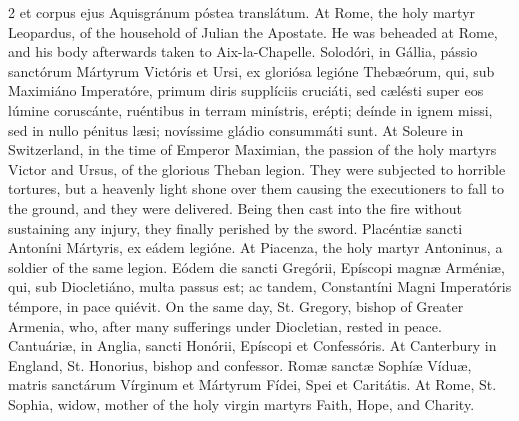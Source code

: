 \begin{paracol}{2}
 et corpus ejus Aquisgránum póstea translátum.
\switchcolumn
{}
At Rome, the holy martyr Leopardus, 
 of the household of Julian the Apostate. He was beheaded at Rome, and 
 his body afterwards taken to Aix-la-Chapelle.
\switchcolumn*
{}
Solodóri, in Gállia, 
 pássio sanctórum Mártyrum Victóris et Ursi, ex gloriósa legióne Thebæórum, 
 qui, sub Maximiáno Imperatóre, primum diris supplíciis cruciáti, sed cælésti 
 super eos lúmine coruscánte, ruéntibus in terram minístris, erépti; deínde 
 in ignem missi, sed in nullo pénitus læsi; novíssime gládio consummáti sunt.
\switchcolumn
{}
At Soleure in Switzerland, in the 
 time of Emperor Maximian, the passion of the holy martyrs Victor and Ursus, 
 of the glorious Theban legion. They were subjected to horrible 
 tortures, but a heavenly light shone over them causing the executioners to 
 fall to the ground, and they were delivered. Being then cast into the 
 fire without sustaining any injury, they finally perished by the sword.
\switchcolumn*
{}
Placéntiæ sancti 
 Antoníni Mártyris, ex eádem legióne.
\switchcolumn
{}
At Piacenza, the holy martyr 
 Antoninus, a soldier of the same legion.
\switchcolumn*
{}
Eódem die sancti 
 Gregórii, Epíscopi magnæ Arméniæ, qui, sub Diocletiáno, multa passus est; ac 
 tandem, Constantíni Magni Imperatóris témpore, in pace quiévit.
\switchcolumn
{}
On the same day, St. Gregory, bishop 
 of Greater Armenia, who, after many sufferings under Diocletian, rested in 
 peace.
\switchcolumn*
{}
Cantuáriæ, in Anglia, 
 sancti Honórii, Epíscopi et Confessóris.
\switchcolumn
{}
At Canterbury in England, St. 
 Honorius, bishop and confessor.
\switchcolumn*
{}
Romæ sanctæ Sophíæ 
 Víduæ, matris sanctárum Vírginum et Mártyrum Fídei, Spei et Caritátis.
\switchcolumn
{}
At Rome, St. Sophia, widow, mother 
 of the holy virgin martyrs Faith, Hope, and Charity.
\switchcolumn*
{}
\end{paracol}
